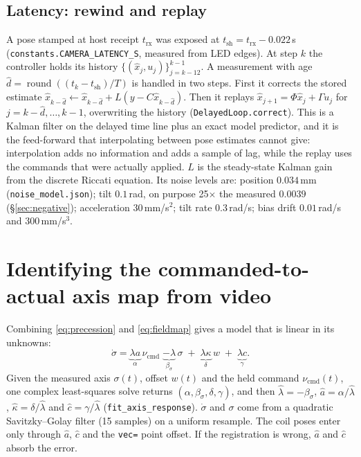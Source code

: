 \documentclass[11pt]{article}
\begin{document}
\subsection{Latency: rewind and replay}
\label{sec:latency}
A pose stamped at host receipt $t_{\mathrm{rx}}$ was exposed at
$t_{\mathrm{sh}}=t_{\mathrm{rx}}-0.022$\,s (\texttt{constants.CAMERA\_LATENCY\_S}, measured from LED
edges). At step $k$ the controller holds its history $\{(\hat x_j,u_j)\}_{j=k-12}^{k-1}$. A
measurement with age $\hat d=\operatorname{round}((t_k-t_{\mathrm{sh}})/T)$ is handled in two steps.
First it corrects the stored estimate $\hat x_{k-\hat d}\leftarrow\hat x_{k-\hat d}+L(y-C\hat x_{k-\hat d})$.
Then it replays $\hat x_{j+1}=\Phi\hat x_j+\Gamma u_j$ for $j=k-\hat d,\dots,k-1$, overwriting the
history (\texttt{DelayedLoop.correct}). This is a Kalman filter on the delayed time line plus an exact
model predictor, and it is the feed-forward that interpolating between pose estimates cannot give:
interpolation adds no information and adds a sample of lag, while the replay uses the commands that
were actually applied. $L$ is the steady-state Kalman gain from the discrete Riccati equation.
Its noise levels are: position $0.034$\,mm (\texttt{noise\_model.json}); tilt $0.1$\,rad, on purpose
25$\times$ the measured $0.0039$ (\S\ref{sec:negative}); acceleration $30$\,mm/s$^2$; tilt rate
$0.3$\,rad/s; bias drift $0.01$\,rad/s and $300$\,mm/s$^3$.

\section{Identifying the commanded-to-actual axis map from video}
\label{sec:identify}
Combining \eqref{eq:precession} and \eqref{eq:fieldmap} gives a model that is linear in its unknowns:
\begin{equation}
\dot\sigma=\underbrace{\lambda a}_{\alpha}\,\nu_{\mathrm{cmd}}\;\underbrace{-\lambda}_{\beta_\sigma}\,\sigma
\;+\;\underbrace{\lambda\kappa}_{\delta}\,w\;+\;\underbrace{\lambda c}_{\gamma}.
\end{equation}
Given the measured axis $\sigma(t)$, offset $w(t)$ and the held command $\nu_{\mathrm{cmd}}(t)$, one
complex least-squares solve returns $(\alpha,\beta_\sigma,\delta,\gamma)$, and then $\hat\lambda=-\beta_\sigma$,
$\hat a=\alpha/\hat\lambda$, $\hat\kappa=\delta/\hat\lambda$ and $\hat c=\gamma/\hat\lambda$
(\texttt{fit\_axis\_response}). $\dot\sigma$ and $\sigma$ come from a quadratic Savitzky--Golay
filter (15 samples) on a uniform resample. The coil poses enter only through $\hat a$, $\hat c$
and the \texttt{vec=} point offset. If the registration is wrong, $\hat a$ and $\hat c$ absorb the
error.
\end{document}
